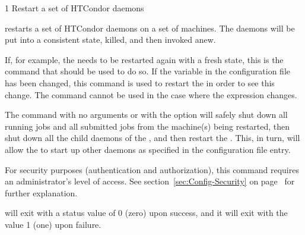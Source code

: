 \begin{ManPage}{\label{man-condor-restart}}{1}
{Restart a set of HTCondor daemons}
\Synopsis {}
\ToolArgsBase

\ToolDebugOption
{}
\ToolWhere
\ToolArgsAffect


\Description 

 restarts a set of HTCondor daemons on a set
of machines.
The daemons will be put into a consistent state,
killed, and then invoked anew.

If, for example, the  needs to be restarted again with
a fresh state, this is the command that should be used to do so.
If the  variable in the configuration file has
been changed, this command is used to restart the 
in order to see this change.
The  command cannot be used in the case where the
 expression changes.

The command
 with no arguments or with the 
 option
will safely shut down all running jobs and all submitted
jobs from the machine(s) being restarted, then shut down
all the child daemons of the ,
and then restart the .
This, in turn, will allow the  to start up
other daemons as specified in the  configuration
file entry.

For security purposes (authentication and authorization),
this command requires an administrator's level of access.
See
section~\ref{sec:Config-Security} on page~\pageref{sec:Config-Security}
for further explanation.

\begin{Options}
    \ToolArgsBaseDesc
    \ToolDebugDesc
    \ToolArgsLocateDesc
    \ToolArgsAffectDesc

\end{Options}

\ExitStatus

 will exit with a status value of 0 (zero) upon success,
and it will exit with the value 1 (one) upon failure.


\end{ManPage}
